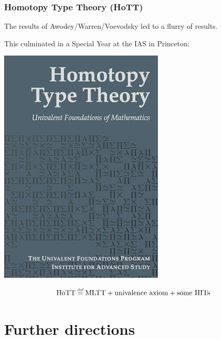 \documentclass[handout]{beamer} %
\begin{document}
\begin{frame}
  \frametitle{Homotopy Type Theory (HoTT)}
  
  The results of Awodey/Warren/Voevodsky led to a flurry of results.

  This culminated in a Special Year at the IAS in Princeton:
  
  \begin{center}
    \includegraphics[scale=0.7]{hott.png}
  \end{center}
  
  \[
    \text{HoTT} \defeq \text{MLTT} + \text{univalence axiom} + \text{some HITs}
  \]

\end{frame}


\section{Further directions}
\end{document}
